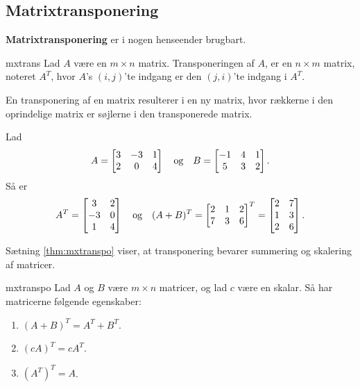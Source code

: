 \subsection{Matrixtransponering}
%
\textbf{Matrixtransponering} er i nogen henseender brugbart. 
%
%
%
\begin{defn}{}{mxtrans}
Lad $A$ være en $m \times n$ matrix. Transponeringen af $A$, er en $n \times m$ matrix, noteret $A^T$, hvor $A$'s $(i,j)$'te indgang er den $(j,i)$'te indgang i $A^T$.
\end{defn}
\noindent
%
En transponering af en matrix resulterer i en ny matrix, hvor rækkerne i den oprindelige matrix er søjlerne i den transponerede matrix.
\\
%
\begin{eks}
\label{eks:trans}
%
Lad 
%
\begin{align*}
A= 
\begin{bmatrix}
3	&	-3	&	1 \\
2	&	0	&	4
\end{bmatrix}
\text{\phantom{---}og\phantom{---}}
B= 
\begin{bmatrix}
-1	&	4	&	1\\
5	&	3	&	2
\end{bmatrix}.
\end{align*}
%
Så er
%
\begin{align*}
A^T =
\begin{bmatrix}
3	&	2\\
-3	&	0\\
1	&	4
\end{bmatrix}
\text{\phantom{---}og\phantom{---}}
(A+B)^T=
\begin{bmatrix}
2	&	1	&	2\\
7	&	3	&	6
\end{bmatrix}^T
=
\begin{bmatrix}
2	&	7\\
1	&	3\\
2	&	6
\end{bmatrix}.
\end{align*}
%
\end{eks}
%
%
Sætning \ref{thm:mxtranspo} viser, at transponering bevarer summering og skalering af matricer.
%
\begin{thm}{}{mxtranspo}
Lad $A$ og $B$ være $m \times n$ matricer, og lad $c$ være en skalar.
Så har matricerne følgende egenskaber:
\begin{enumerate}[label=(\alph*)]
\item $(A + B)^T = A^T + B^T$.
\item $(cA)^T = cA^T$.
\item $(A^T)^T = A$.
\end{enumerate}
\end{thm}
